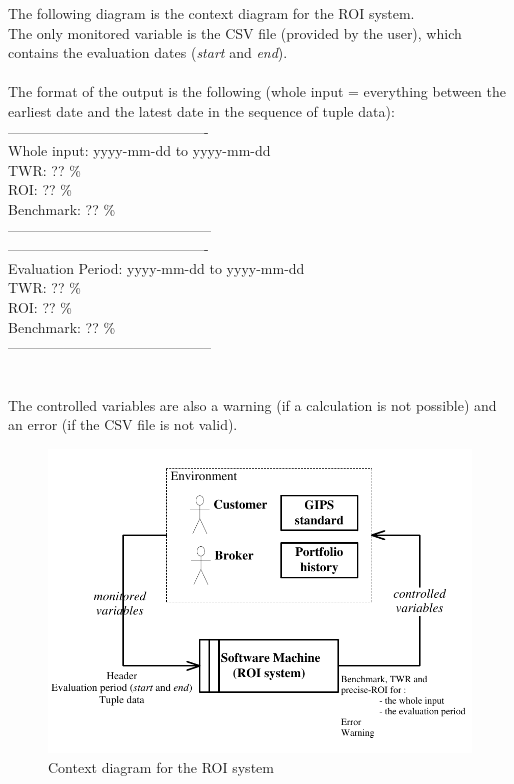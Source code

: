 \documentclass[runningheads,12pt]{article}
\begin{document}
The following diagram is the context diagram for the ROI system.\\
The only monitored variable is the CSV file (provided by the user), which contains the evaluation dates (\textit{start} and \textit{end}).\\
\\
The format of the output is the following (whole input = everything between the earliest date and the latest date in the sequence of tuple data):\\
-------------------------------------------\\
Whole input: yyyy-mm-dd to yyyy-mm-dd\\
TWR: ?? \%\\
ROI: ?? \%\\
Benchmark: ?? \%\\
--------------------------------------------\\
-------------------------------------------\\
Evaluation Period: yyyy-mm-dd to yyyy-mm-dd\\
TWR: ?? \%\\
ROI: ?? \%\\
Benchmark: ?? \%\\
--------------------------------------------\\
\\
\\
The controlled variables are also a warning (if a calculation is not possible) and an error (if the CSV file is not valid).\\

\begin{figure}
\centering
\includegraphics[scale=1.0]{inputs/context.pdf}
\caption{Context diagram for the ROI system}
\label{fig:ROI-context}
\end{figure}
\end{document}
